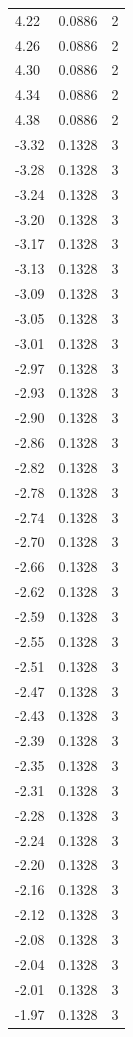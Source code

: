 \begin{longtable}{lrr}
  4.22 & 0.0886 & 2 \\
  4.26 & 0.0886 & 2 \\
  4.30 & 0.0886 & 2 \\
  4.34 & 0.0886 & 2 \\
  4.38 & 0.0886 & 2 \\
  -3.32 & 0.1328 & 3 \\
  -3.28 & 0.1328 & 3 \\
  -3.24 & 0.1328 & 3 \\
  -3.20 & 0.1328 & 3 \\
  -3.17 & 0.1328 & 3 \\
  -3.13 & 0.1328 & 3 \\
  -3.09 & 0.1328 & 3 \\
  -3.05 & 0.1328 & 3 \\
  -3.01 & 0.1328 & 3 \\
  -2.97 & 0.1328 & 3 \\
  -2.93 & 0.1328 & 3 \\
  -2.90 & 0.1328 & 3 \\
  -2.86 & 0.1328 & 3 \\
  -2.82 & 0.1328 & 3 \\
  -2.78 & 0.1328 & 3 \\
  -2.74 & 0.1328 & 3 \\
  -2.70 & 0.1328 & 3 \\
  -2.66 & 0.1328 & 3 \\
  -2.62 & 0.1328 & 3 \\
  -2.59 & 0.1328 & 3 \\
  -2.55 & 0.1328 & 3 \\
  -2.51 & 0.1328 & 3 \\
  -2.47 & 0.1328 & 3 \\
  -2.43 & 0.1328 & 3 \\
  -2.39 & 0.1328 & 3 \\
  -2.35 & 0.1328 & 3 \\
  -2.31 & 0.1328 & 3 \\
  -2.28 & 0.1328 & 3 \\
  -2.24 & 0.1328 & 3 \\
  -2.20 & 0.1328 & 3 \\
  -2.16 & 0.1328 & 3 \\
  -2.12 & 0.1328 & 3 \\
  -2.08 & 0.1328 & 3 \\
  -2.04 & 0.1328 & 3 \\
  -2.01 & 0.1328 & 3 \\
  -1.97 & 0.1328 & 3 \\

\end{longtable}
